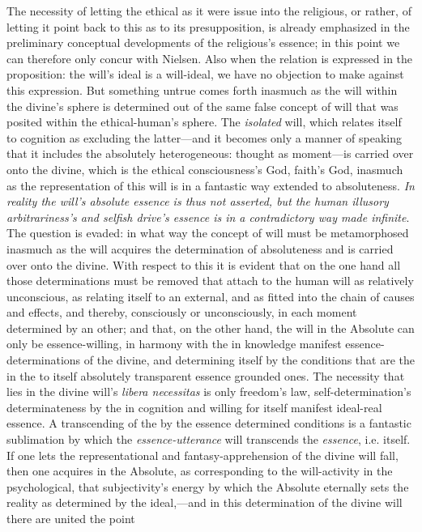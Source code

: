 \documentclass[12pt,a4paper]{book}
\begin{document}
The necessity of letting the ethical as it were issue into the religious, or rather, of letting it point
back to this as to its presupposition, is already emphasized in the preliminary conceptual developments of
the religious's essence; in this point we can therefore only concur with Nielsen. Also when the relation is
expressed in the proposition: the will's ideal is a will-ideal, we have no objection to make against this
expression. But something untrue comes forth inasmuch as the will within the divine's sphere is determined
out of the same false concept of will that was posited within the ethical-human's sphere. The \emph{isolated} will,
which relates itself to cognition as excluding the latter---and it becomes only a manner of speaking that it
includes the absolutely heterogeneous: thought as moment---is carried over onto the divine, which is the
ethical consciousness's God, faith's God, inasmuch as the representation of this will is in a fantastic way
extended to absoluteness. \emph{In reality the will's absolute essence is thus not asserted, but the human
illusory arbitrariness's and selfish drive's essence is in a contradictory way made infinite}. The question
is evaded: in what way the concept of will must be metamorphosed inasmuch as the will acquires the
determination of absoluteness and is carried over onto the divine. With respect to this it is evident that on
the one hand all those determinations must be removed that attach to the human will as relatively unconscious,
as relating itself to an external, and as fitted into the chain of causes and effects, and thereby,
consciously or unconsciously, in each moment determined by an other; and that, on the other hand, the will in
the Absolute can only be essence-willing, in harmony with the in knowledge manifest essence-determinations of
the divine, and determining itself by the conditions that are the in the to itself absolutely transparent
essence grounded ones. The necessity that lies in the divine will's \textit{libera necessitas} is only
freedom's law, self-determination's determinateness by the in cognition and willing for itself manifest
ideal-real essence. A transcending of the by the essence determined conditions is a fantastic sublimation by
which the \emph{essence-utterance} will transcends the \emph{essence}, i.e. itself. If one lets the representational
and fantasy-apprehension of the divine will fall, then one acquires in the Absolute, as corresponding to the
will-activity in the psychological, that subjectivity's energy by which the Absolute eternally sets the
reality as determined by the ideal,---and in this determination of the divine will there are united the point
\end{document}
